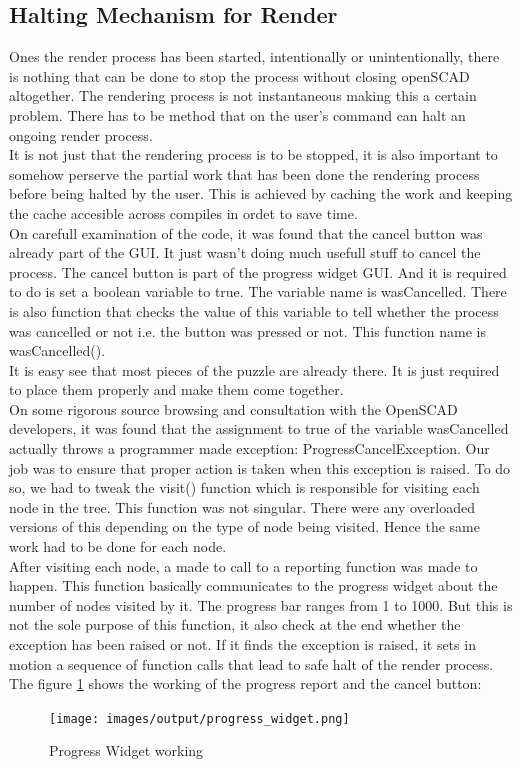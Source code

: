\subsection{Halting Mechanism for Render}
Ones the render process has been started, intentionally or unintentionally, there is nothing that can be done to stop the process without closing openSCAD altogether. The rendering process is not instantaneous making this a certain problem. There has to be method that on the user's command can halt an ongoing render process.\\
It is not just that the rendering process is to be stopped, it is also important to somehow perserve the partial work that has been done the rendering process before being halted by the user. This is achieved by caching the work and keeping the cache accesible across compiles in ordet to save time.\\
On carefull examination of the code, it was found that the cancel button was already part of the GUI. It just wasn't doing much usefull stuff to cancel the process. The cancel button is part of the progress widget GUI. And it is required to do is set a boolean variable to true. The variable name is wasCancelled. There is also function that checks the value of this variable to tell whether the process was cancelled or not i.e. the button was pressed or not. This function name is wasCancelled().\\
It is easy see that most pieces of the puzzle are already there. It is just required to place them properly and make them come together.\\
On some rigorous source browsing and consultation with the OpenSCAD developers, it was found that the assignment to true of the variable wasCancelled actually throws a programmer made exception: ProgressCancelException. Our job was to ensure that proper action is taken when this exception is raised. To do so, we had to tweak the visit() function which is responsible for visiting each node in the tree. This function was not singular. There were any overloaded versions of this depending on the type of node being visited. Hence the same work had to be done for each node.\\
After visiting each node, a made to call to a reporting function was made to happen. This function basically communicates to the progress widget about the number of nodes visited by it. The progress bar ranges from 1 to 1000. But this is not the sole purpose of this function, it also check at the end whether the exception has been raised or not. If it finds the exception is raised, it sets in motion a sequence of function calls that lead to safe halt of the render process. The figure \ref{fig:progress_widget} shows the working of the progress report and the cancel button:
\begin{figure}
	\centering
	\texttt{[image: images/output/progress\_widget.png]}
	\caption{Progress Widget working}
	\label{fig:progress_widget}
\end{figure}
